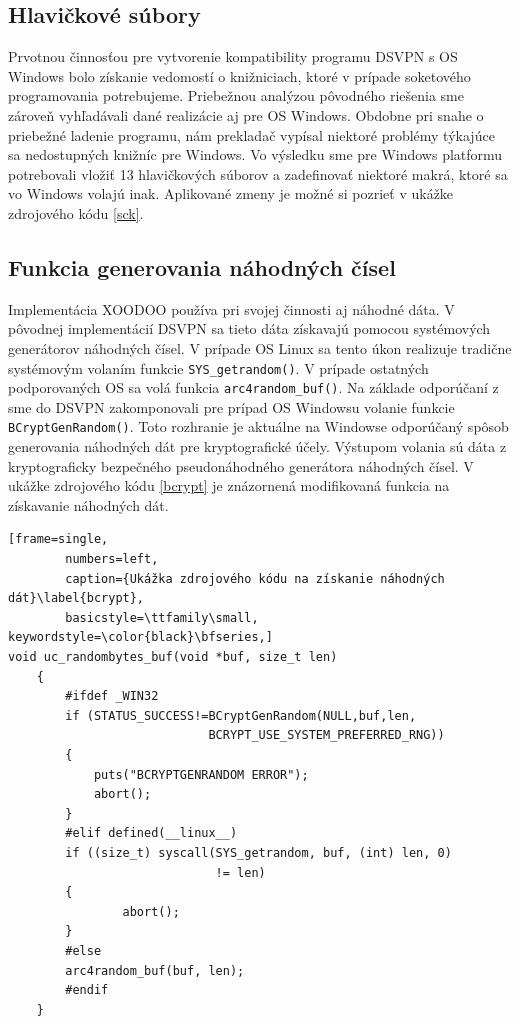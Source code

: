 \subsection{Hlavičkové súbory}
Prvotnou činnosťou pre vytvorenie kompatibility programu DSVPN s OS Windows bolo získanie vedomostí o knižniciach, ktoré v prípade soketového programovania potrebujeme. Priebežnou analýzou pôvodného riešenia sme zároveň vyhľadávali dané realizácie aj pre OS Windows. Obdobne pri snahe o priebežné ladenie programu, nám prekladač vypísal niektoré problémy týkajúce sa nedostupných knižníc pre Windows. Vo výsledku sme pre Windows platformu potrebovali vložiť 13 hlavičkových súborov a zadefinovať niektoré makrá, ktoré sa vo Windows volajú inak. Aplikované zmeny je možné si pozrieť v ukážke zdrojového kódu \ref{sck}. 
\subsection{Funkcia generovania náhodných čísel}
Implementácia XOODOO používa pri svojej činnosti aj náhodné dáta. V pôvodnej implementácií DSVPN sa tieto dáta získavajú pomocou systémových generátorov náhodných čísel. V prípade OS Linux sa tento úkon realizuje tradične systémovým volaním funkcie \lstinline|SYS_getrandom()|. V prípade ostatných podporovaných OS sa volá funkcia \lstinline|arc4random_buf()|. 
Na základe odporúčaní z \cite{bc} sme do DSVPN zakomponovali pre prípad OS Windowsu volanie funkcie \\\lstinline|BCryptGenRandom()|. Toto rozhranie je aktuálne na Windowse odporúčaný spôsob generovania náhodných dát pre kryptografické účely. Výstupom volania sú dáta z kryptograficky bezpečného pseudonáhodného generátora náhodných čísel. V ukážke zdrojového kódu \ref{bcrypt} je znázornená modifikovaná funkcia na získavanie náhodných dát. 

\begin{minipage}{\linewidth} 	
	\begin{lstlisting}[frame=single,
		numbers=left,
		caption={Ukážka zdrojového kódu na získanie náhodných dát}\label{bcrypt},
		basicstyle=\ttfamily\small, keywordstyle=\color{black}\bfseries,]
void uc_randombytes_buf(void *buf, size_t len)
	{
		#ifdef _WIN32
		if (STATUS_SUCCESS!=BCryptGenRandom(NULL,buf,len, 
		                    BCRYPT_USE_SYSTEM_PREFERRED_RNG))
		{
			puts("BCRYPTGENRANDOM ERROR");
			abort();
		}
		#elif defined(__linux__)  
		if ((size_t) syscall(SYS_getrandom, buf, (int) len, 0)
		                     != len) 
		{
				abort();
		}
		#else
		arc4random_buf(buf, len);
		#endif
	}	
	\end{lstlisting}
\end{minipage}\\

